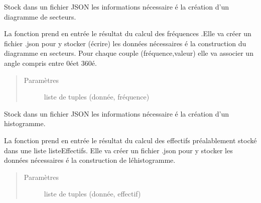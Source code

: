 \documentclass[letterpaper,10pt,french]{sphinxmanual}
\begin{document}

\begin{fulllineitems}
\label{\detokenize{addQualitatives:add.addQualitatives.infoSecteurs}}
Stock dans un fichier JSON les informations nécessaire é la création d’un diagramme de secteurs.

La fonction prend en entrée le résultat du calcul des fréquences .Elle va créer un fichier .json pour y stocker (écrire)
les données nécessaires é la construction du diagramme en secteurs. Pour chaque couple (fréquence,valeur) elle va associer 
un angle compris entre 0éet 360é.
\begin{quote}\begin{description}
\item[{Paramètres}] \leavevmode
{} \textendash{} liste de tuples (donnée, fréquence)

\end{description}\end{quote}

\end{fulllineitems}


\begin{fulllineitems}
\label{\detokenize{addQualitatives:add.addQualitatives.infoHistogramme}}
Stock dans un fichier JSON les informations nécessaire é la création d’un histogramme.

La fonction prend en entrée le résultat du calcul des effectifs préalablement stocké dans une liste listeEffectifs. Elle 
va créer un fichier .json pour y stocker les données nécessaires é la construction de léhistogramme.
\begin{quote}\begin{description}
\item[{Paramètres}] \leavevmode
{} \textendash{} liste de tuples (donnée, effectif)

\end{description}\end{quote}

\end{fulllineitems}
\end{document}
